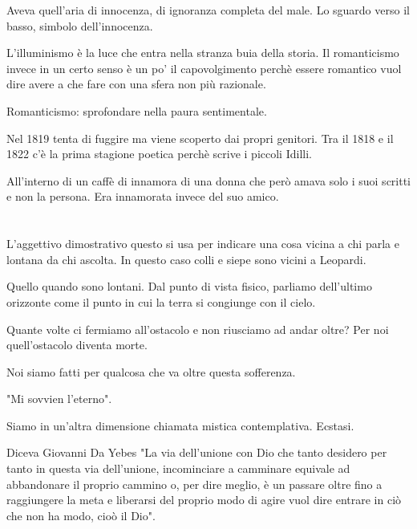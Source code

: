 \documentclass{article}
\begin{document}
    Aveva quell'aria di innocenza, di ignoranza completa del male.
    Lo sguardo verso il basso, simbolo dell'innocenza.

    L'illuminismo è la luce che entra nella stranza buia della storia. Il romanticismo invece in un certo senso è un po' il capovolgimento perchè essere romantico vuol dire avere a che fare con una sfera non più razionale.

    Romanticismo: sprofondare nella paura sentimentale.

    Nel 1819 tenta di fuggire ma viene scoperto dai propri genitori. Tra il 1818 e il 1822 c'è la prima stagione poetica perchè scrive i piccoli Idilli.

    All'interno di un caffè di innamora di una donna che però amava solo i suoi scritti e non la persona. Era innamorata invece del suo amico.

    \section{}
    
    L'aggettivo dimostrativo questo si usa per indicare una cosa vicina a chi parla e lontana da chi ascolta. In questo caso colli e siepe sono vicini a Leopardi.

    Quello quando sono lontani.
    Dal punto di vista fisico, parliamo dell'ultimo orizzonte come il punto in cui la terra si congiunge con il cielo.

    Quante volte ci fermiamo all'ostacolo e non riusciamo ad andar oltre? Per noi quell'ostacolo diventa morte.
    
    Noi siamo fatti per qualcosa che va oltre questa sofferenza.

    "Mi sovvien l'eterno".

    Siamo in un'altra dimensione chiamata mistica contemplativa. Ecstasi.

    Diceva Giovanni Da Yebes "La via dell'unione con Dio che tanto desidero per tanto in questa via dell'unione, incominciare a camminare equivale ad abbandonare il proprio cammino o, per dire meglio, è un passare oltre fino a raggiungere la meta e liberarsi del proprio modo di agire vuol dire entrare in ciò che non ha modo, cioò il Dio".
\end{document}
